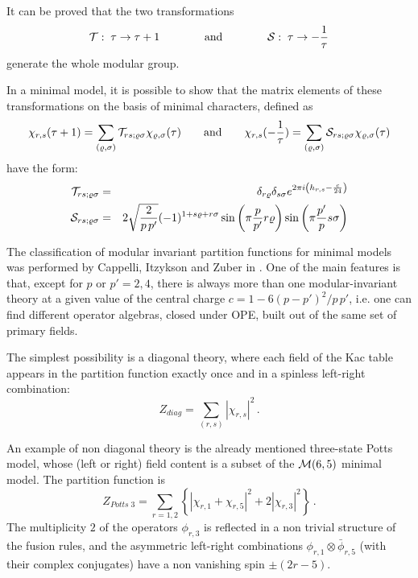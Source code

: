 \documentclass[a4paper,12pt]{report}
\begin{document}
It can be proved that the two transformations
\begin{equation}\label{T,S}
{\cal T}:\;\tau\rightarrow\tau+1\qquad\qquad\textrm{and}\qquad\qquad {\cal S}:\;\tau\rightarrow -\frac{1}{\tau}
\end{equation}
generate the whole modular group.

In a minimal model, it is possible to show that the matrix elements of these transformations on the basis of
minimal characters, defined as
\begin{equation}
\chi_{r,s}(\tau+1)=\sum_{(\varrho,\sigma)}{\cal
T}_{rs;\varrho\sigma}\chi_{\varrho,\sigma}(\tau)\qquad\textrm{and}\qquad
\chi_{r,s}(-\frac{1}{\tau})=\sum_{(\varrho,\sigma)}{\cal S}_{rs;\varrho\sigma}\chi_{\varrho,\sigma}(\tau)
\end{equation}
have the form:
\begin{eqnarray}
{\cal T}_{rs;\varrho\sigma}&=& \delta_{r\varrho}\delta_{s\sigma}e^{2\pi i\left(h_{r,s}-\frac{c}{24}\right)}\\
{\cal S}_{rs;\varrho\sigma}&=&
2\sqrt{\frac{2}{p\,p'}}(-1)^{1+s\varrho+r\sigma}\sin\left(\pi\frac{p}{p'}r\varrho\right)
\sin\left(\pi\frac{p'}{p}s\sigma\right) \label{modmatr}
\end{eqnarray}

The classification of modular invariant partition functions for minimal models was performed by Cappelli,
Itzykson and Zuber in \cite{ciz}. One of the main features is that, except for $p$ or $p'=2,4$, there is always
more than one modular-invariant theory at a given value of the central charge $c=1-6(p-p')^{2}/p\,p'$, i.e. one
can find different operator algebras, closed under OPE, built out of the same set of primary fields.

The simplest possibility is a diagonal theory, where each field of the Kac table appears in the partition
function exactly once and in a spinless left-right combination:
\begin{equation}
Z_{diag}=\sum_{(r,s)}|\chi _{r,s }|^{2}\,.
\end{equation}

An example of non diagonal theory is the already mentioned three-state Potts model, whose (left or right) field
content is a subset of the ${\cal M}(6,5)$ minimal model. The partition function is
\begin{equation}
Z_{Potts\;3}=\sum_{r=1,2}\left\{|\chi _{r,1}+\chi _{r,5}|^{2}+2|\chi _{r,3}|^{2}\right\}\,.
\end{equation}
The multiplicity $2$ of the operators $\phi_{r,3}$ is reflected in a non trivial structure of the fusion rules,
and the asymmetric left-right combinations $\phi_{r,1}\otimes\bar{\phi}_{r,5}$ (with their complex conjugates)
have a non vanishing spin $\pm (2r-5)$.
\end{document}

